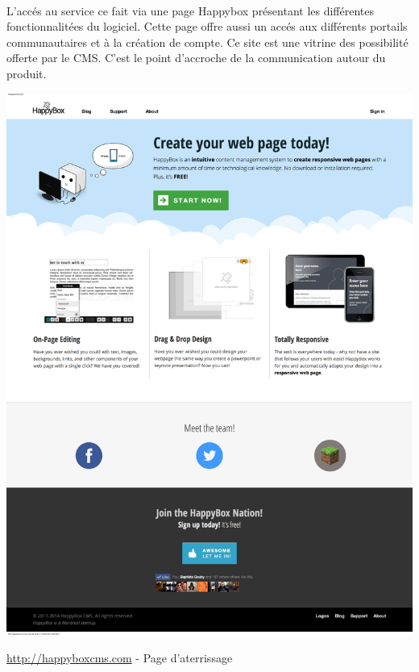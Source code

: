 \documentclass[11pt, a4paper ]{article}
\begin{document}


\paragraph{}
L'accés au service ce fait via une page Happybox présentant les différentes fonctionnalitées du logiciel. Cette page offre aussi un accés aux différents portails communautaires et à la création de compte. Ce site est une vitrine des possibilité offerte par le CMS. C'est le point d'accroche de la communication autour du produit.


\begin{center}
		\includegraphics[width=\textwidth]{images/HBscreen/fullLanding.png}
		\caption{\url{http://happyboxcms.com} - Page d'aterrissage}
\end{center}
\end{document}
